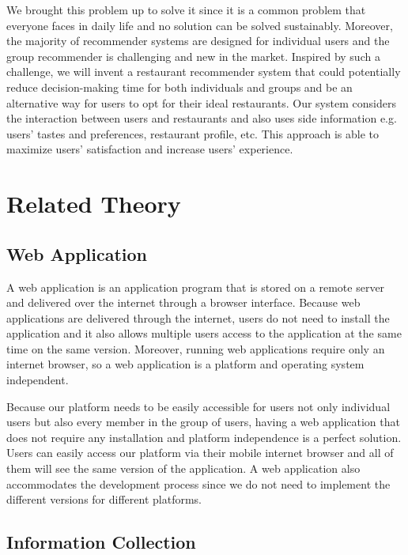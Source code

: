 \documentclass[12pt,oneside,openright,a4paper]{cpe-english-project}
\begin{document}
We brought this problem up to solve it since it is a common problem that everyone faces in daily life and no solution can be solved sustainably. Moreover, the majority of recommender systems are designed for individual users and the group recommender is challenging and new in the market. Inspired by such a challenge, we will invent a restaurant recommender system that could potentially reduce decision-making time for both individuals and groups and be an alternative way for users to opt for their ideal restaurants. Our system considers the interaction between users and restaurants and also uses side information e.g. users’ tastes and preferences, restaurant profile, etc. This approach is able to maximize users’ satisfaction and increase users’ experience.


\section{Related Theory}

\subsection{Web Application}

A web application is an application program that is stored on a remote server and delivered over the internet through a browser interface. \cite{WhatIsWebApplicationWebAppsAndItsBenefits} Because web applications are delivered through the internet, users do not need to install the application and it also allows multiple users access to the application at the same time on the same version. Moreover, running web applications require only an internet browser, so a web application is a platform and operating system independent.

Because our platform needs to be easily accessible for users not only individual users but also every member in the group of users, having a web application that does not require any installation and platform independence is a perfect solution. Users can easily access our platform via their mobile internet browser and all of them will see the same version of the application. A web application also accommodates the development process since we do not need to implement the different versions for different platforms.


\subsection{Information Collection}
\end{document}
